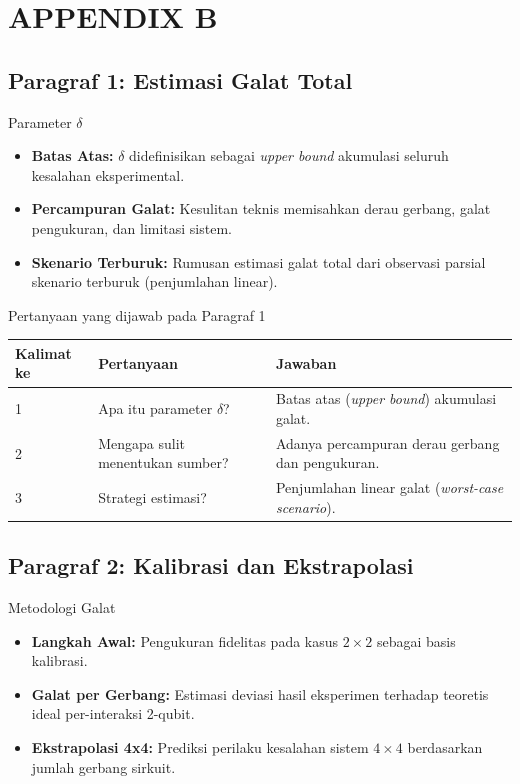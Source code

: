 \section{APPENDIX B}

\subsection{Paragraf 1: Estimasi Galat Total}
\begin{frame}{Parameter $\delta$}
    \begin{itemize}
        \item \textbf{Batas Atas:} $\delta$ didefinisikan sebagai \textit{upper bound} akumulasi seluruh kesalahan eksperimental.
        \item \textbf{Percampuran Galat:} Kesulitan teknis memisahkan derau gerbang, galat pengukuran, dan limitasi sistem.
        \item \textbf{Skenario Terburuk:} Rumusan estimasi galat total dari observasi parsial skenario terburuk (penjumlahan linear).
    \end{itemize}
\end{frame}

\begin{frame}{Pertanyaan yang dijawab pada Paragraf 1}
    \centering
    \small
    \begin{tabular}{lp{4.5cm}p{6cm}}
        \toprule
        Kalimat ke & Pertanyaan & Jawaban \\
        \midrule
        1 & Apa itu parameter $\delta$? & Batas atas (\textit{upper bound}) akumulasi galat. \\
        2 & Mengapa sulit menentukan sumber? & Adanya percampuran derau gerbang dan pengukuran. \\
        3 & Strategi estimasi? & Penjumlahan linear galat (\textit{worst-case scenario}). \\
        \bottomrule
    \end{tabular}
\end{frame}

\subsection{Paragraf 2: Kalibrasi dan Ekstrapolasi}
\begin{frame}{Metodologi Galat}
    \begin{itemize}
        \item \textbf{Langkah Awal:} Pengukuran fidelitas pada kasus $2 \times 2$ sebagai basis kalibrasi.
        \item \textbf{Galat per Gerbang:} Estimasi deviasi hasil eksperimen terhadap teoretis ideal per-interaksi 2-qubit.
        \item \textbf{Ekstrapolasi 4x4:} Prediksi perilaku kesalahan sistem $4 \times 4$ berdasarkan jumlah gerbang sirkuit.
    \end{itemize}
\end{frame}

